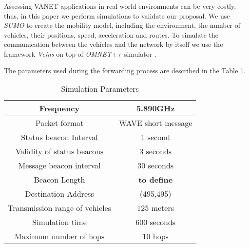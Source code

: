 \documentclass[conference]{IEEEtran}
\begin{document}
Assessing VANET applications in real world environments can be very costly, thus, in this paper we perform simulations to validate our proposal. We use \emph{SUMO} \cite{sumo2014} to create the mobility model, including the environment, the number of vehicles, their positions, speed, acceleration and routes. To simulate the communication between the vehicles and the network by itself we use the framework \emph{Veins} \cite{veins2014} on top of \emph{OMNET++} simulator \cite{omnet2014}.

The parameters used during the forwarding process are described in the Table \ref{simulation-param}.


\begin{table}[ht]
\centering
\caption{Simulation Parameters} \label{simulation-param}
\begin{tabular}{|c|c|}
\hline
Frequency                      & 5.890GHz                                  \\ \hline
Packet format                  & WAVE short message                        \\ \hline
Status beacon Interval         & 1 second                                  \\ \hline
Validity of status beacons     & 3 seconds                                 \\ \hline
Message beacon interval        & 30 seconds                                \\ \hline
Beacon Length                  & \textbf{to define} \\ \hline
Destination Address            & (495,495)                                 \\ \hline
Transmission range of vehicles & 125 meters                                \\ \hline
Simulation time                & 600 seconds                               \\ \hline
Maximum number of hops         & 10 hops                                   \\ \hline
\end{tabular}
\end{table}

\end{document}
